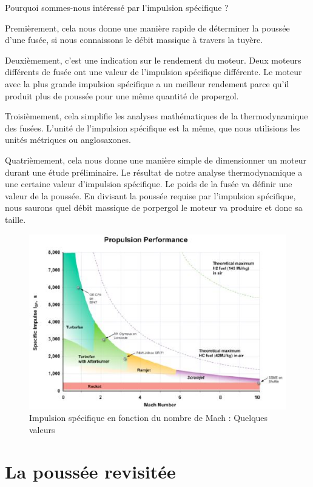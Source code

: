 \documentclass{report}
\begin{document}
Pourquoi sommes-nous intéressé par l'impulsion spécifique ? 

Premièrement, cela nous donne une manière rapide de déterminer la poussée d'une fusée, si nous connaissons le débit massique à travers la tuyère. 

Deuxièmement, c'est une indication sur le rendement du moteur. Deux moteurs différents de fusée ont une valeur de l'impulsion spécifique différente. Le moteur avec la plus grande impulsion spécifique a un meilleur rendement parce qu'il produit plus de poussée pour une même quantité de propergol. 

Troisièmement, cela simplifie les analyses mathématiques de la thermodynamique des fusées. L'unité de l'impulsion spécifique est la même, que nous utilisions les unités métriques ou anglosaxones.

Quatrièmement, cela nous donne une manière simple de dimensionner un moteur durant une étude préliminaire. Le résultat de notre analyse thermodynamique a une certaine valeur d'impulsion spécifique. Le poids de la fusée va définir une valeur de la poussée. En divisant la poussée requise par l'impulsion spécifique, nous saurons quel débit massique de porpergol le moteur va produire et donc sa taille.

\begin{figure}[h!]
    \centering
    \includegraphics{51.JPG}
    \caption{Impulsion spécifique en fonction du nombre de Mach : Quelques valeurs}
    \label{51}
\end{figure}


\section{La poussée revisitée}
\end{document}
